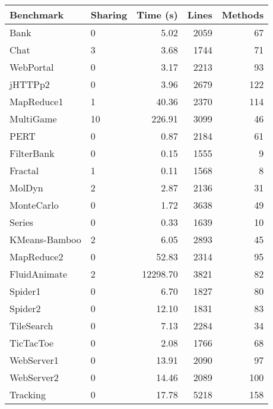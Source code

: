 \documentclass{amsart}[9pt]
\begin{document}
\begin{tabular}{|l|l|r|r|r|}
\hline
Benchmark & Sharing & Time (s) & Lines & Methods \\
\hline
Bank          & 0  & 5.02     & 2059 & 67 \\
Chat          & 3  & 3.68     & 1744 & 71 \\
WebPortal     & 0  & 3.17     & 2213 & 93 \\
jHTTPp2       & 0  & 3.96     & 2679 & 122 \\
MapReduce1    & 1  & 40.36    & 2370 & 114 \\
MultiGame     & 10 & 226.91   & 3099 & 46 \\
PERT          & 0  & 0.87     & 2184 & 61 \\
FilterBank    & 0  & 0.15     & 1555 & 9 \\
Fractal       & 1  & 0.11     & 1568 & 8 \\
MolDyn        & 2  & 2.87     & 2136 & 31 \\
MonteCarlo    & 0  & 1.72     & 3638 & 49 \\
Series        & 0  & 0.33     & 1639 & 10 \\
KMeans-Bamboo & 2  & 6.05     & 2893 & 45 \\
MapReduce2    & 0  & 52.83    & 2314 & 95 \\
FluidAnimate  & 2  & 12298.70 & 3821 & 82 \\
Spider1       & 0  & 6.70     & 1827 & 80 \\
Spider2       & 0  & 12.10    & 1831 & 83 \\
TileSearch    & 0  & 7.13     & 2284 & 34 \\
TicTacToe     & 0  & 2.08     & 1766 & 68 \\
WebServer1    & 0  & 13.91    & 2090 & 97 \\
WebServer2    & 0  & 14.46    & 2089 & 100 \\
Tracking      & 0  & 17.78    & 5218 & 158 \\
\hline
\end{tabular}
\end{document}
